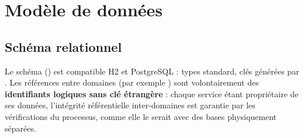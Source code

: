 \chapter{Modèle de données}\label{chap:donnees}

\section{Schéma relationnel}
Le schéma () est compatible H2 et PostgreSQL : types standard, clés générées par
. Les références entre domaines (par exemple )
sont volontairement des \textbf{identifiants logiques sans clé étrangère} : chaque service étant propriétaire de ses
données, l'intégrité référentielle inter-domaines est garantie par les vérifications du processus, comme elle le
serait avec des bases physiquement séparées.


